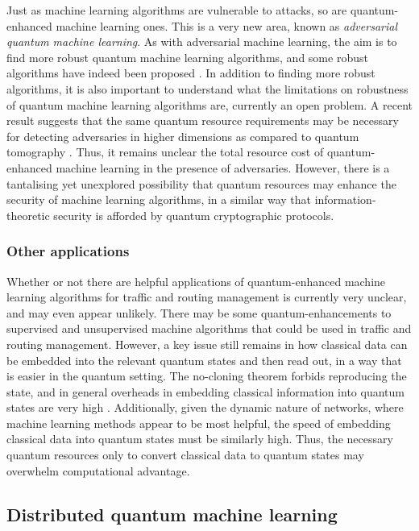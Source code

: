 \documentclass[twocolumn, aps, rmp, amsmath, amssymb, nofootinbib, superscriptaddress, longbibliography, floatfix, table-of-contents, eqsecnum]{revtex4}
\begin{document}
Just as machine learning algorithms are vulnerable to attacks, so are quantum-enhanced machine learning ones. This is a very new area, known as \textit{adversarial quantum machine learning}. As with adversarial machine learning, the aim is to find more robust quantum machine learning algorithms, and some robust algorithms have indeed been proposed \cite{bib:wiebe2018hardening}. In addition to finding more robust algorithms, it is also important to understand what the limitations on robustness of quantum machine learning algorithms are, currently an open problem. A recent result suggests that the same quantum resource requirements may be necessary for detecting adversaries in higher dimensions as compared to quantum tomography \cite{bib:advql}. Thus, it remains unclear the total resource cost of quantum-enhanced machine learning in the presence of adversaries. However, there is a tantalising yet unexplored possibility that quantum resources may enhance the security of machine learning algorithms, in a similar way that information-theoretic security is afforded by quantum cryptographic protocols.

\subsubsection{Other applications}

Whether or not there are helpful applications of quantum-enhanced machine learning algorithms for traffic and routing management is currently very unclear, and may even appear unlikely. There may be some quantum-enhancements to supervised and unsupervised machine algorithms that could be used in traffic and routing management. However, a key issue still remains in how classical data can be embedded into the relevant quantum states and then read out, in a way that is easier in the quantum setting. The no-cloning theorem forbids reproducing the state, and in general overheads in embedding classical information into quantum states are very high \cite{bib:giovannetti2008quantum, bib:giovannetti2008architectures}. Additionally, given the dynamic nature of networks, where machine learning methods appear to be most helpful, the speed of embedding classical data into quantum states must be similarly high. Thus, the necessary quantum resources only to convert classical data to quantum states may overwhelm computational advantage. 

\subsection{Distributed quantum machine learning}
\end{document}
